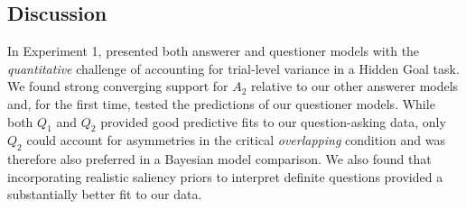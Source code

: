 \documentclass[11pt, floatsintext]{apa6}
\begin{document}



\subsection{Discussion}

In Experiment 1, presented both answerer and questioner models with the  \emph{quantitative} challenge of accounting for trial-level variance in a Hidden Goal task. 
We found strong converging support for $A_2$ relative to our other answerer models and, for the first time, tested the predictions of our questioner models. 
While both $Q_1$ and $Q_2$ provided good predictive fits to our question-asking data, only $Q_2$ could account for asymmetries in the critical \emph{overlapping} condition and was therefore also preferred in a Bayesian model comparison. 
We also found that incorporating realistic saliency priors to interpret definite questions provided a substantially better fit to our data. 
\end{document}

